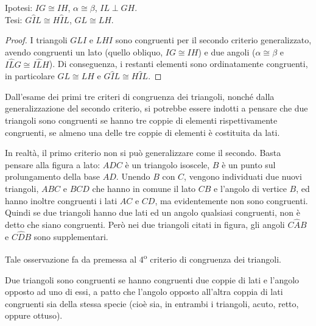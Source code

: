 \noindent \begin{minipage}{0.6\textwidth}
\noindent Ipotesi: \(IG\cong IH\), \(\alpha\cong \beta\), \(IL\perp GH\).\\
Tesi: \(G\widehat{I}L\cong H\widehat{I}L\), \(GL\cong LH\).

\begin{proof}
I triangoli \(GLI\) e \(LHI\) sono congruenti per il secondo criterio 
generalizzato, avendo congruenti un lato (quello obliquo, \(IG\cong 
IH\)) e due angoli (\(\alpha\cong \beta\) e \(I\widehat{L}G \cong 
I\widehat{L}H\)). Di conseguenza, i restanti elementi sono 
ordinatamente congruenti, in particolare \(GL\cong LH\) e 
\(G\widehat{I}L\cong H\widehat{I}L\).
\end{proof}
\end{minipage}\hfil
\begin{minipage}{0.4\textwidth}
\centering
\end{minipage}

\osservazione Dall'esame dei primi tre criteri di congruenza dei 
triangoli, nonché dalla generalizzazione del secondo criterio, si 
potrebbe essere indotti a pensare che due triangoli sono congruenti 
se hanno tre coppie di elementi rispettivamente congruenti, se almeno 
una delle tre coppie di elementi è costituita da lati.

\noindent \begin{minipage}{0.6\textwidth}
In realtà, il primo criterio non si può generalizzare come il 
secondo. Basta pensare alla figura a lato: \(ADC\) è un triangolo 
isoscele, \(B\) è un punto sul prolungamento della base \(AD\). Unendo \(B\) 
con \(C\), vengono individuati due nuovi triangoli, \(ABC\) e \(BCD\) che 
hanno in comune il lato \(CB\) e l'angolo di vertice \(B\), ed hanno 
inoltre congruenti i lati \(AC\) e \(CD\), ma evidentemente non sono 
congruenti. Quindi se due triangoli hanno due lati ed un angolo 
qualsiasi congruenti, non è detto che siano congruenti. Però nei due 
triangoli citati in figura, gli angoli \(C\widehat{A}B\) e 
\(C\widehat{D}B\) sono supplementari.
\end{minipage}\hfil
\begin{minipage}{0.4\textwidth}
\centering
\end{minipage}

Tale osservazione fa da premessa al 4\textsuperscript{o} criterio di 
congruenza dei triangoli.
\begin{teorema}
Due triangoli sono congruenti se hanno congruenti due coppie di lati 
e l'angolo opposto ad uno di essi, a patto che l'angolo opposto 
all'altra coppia di lati congruenti sia della stessa specie (cioè 
sia, in entrambi i triangoli, acuto, retto, oppure ottuso).
\end{teorema}

